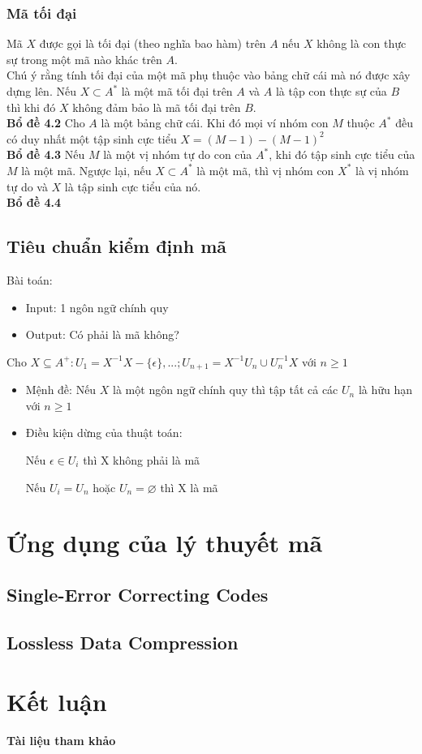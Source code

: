 \documentclass[14pt]{extreport}
\begin{document}
\subsection{Mã tối đại}
Mã $X$ được gọi là tối đại (theo nghĩa bao hàm) trên $A$ nếu $X$ không là con thực sự trong một mã nào khác trên $A$.\\
Chú ý rằng tính tối đại của một mã phụ thuộc vào bảng chữ cái mà nó được xây dựng lên. Nếu $X \subset A^*$ là một mã tối đại trên $A$ và $A$ là tập con thực sự của $B$ thì khi đó $X$ không đảm bảo là mã tối đại trên $B$.\\
\textbf{Bổ đề 4.2} Cho $A$ là một bảng chữ cái. Khi đó mọi ví nhóm con $M$ thuộc $A^*$ đều có duy nhất một tập sinh cực tiểu $X = (M-1) - (M-1)^2$\\
\textbf{Bổ đề 4.3} Nếu $M$ là một vị nhóm tự do con của $A^*$, khi đó tập sinh cực tiểu của $M$ là một mã. Ngược lại, nếu $X \subset A^*$ là một mã, thì vị nhóm con $X^*$ là vị nhóm tự do và $X$ là tập sinh cực tiểu của nó.\\
\textbf{Bổ đề 4.4}

\section{Tiêu chuẩn kiểm định mã}
Bài toán:
\begin{itemize}
\item Input: 1 ngôn ngữ chính quy
\item Output: Có phải là mã không?
\end{itemize}
Cho $X\subseteq A^+: U_1=X^{-1}X-\{\epsilon\},...;U_{n+1}=X^{-1}U_n \cup U_n^{-1}X$ với $n\geq 1$
\begin{itemize}
\item Mệnh đề: Nếu $X$ là một ngôn ngữ chính quy thì tập tất cả các $U_n$ là hữu hạn với $n\geq 1$

\item Điều kiện dừng của thuật toán:

Nếu $\epsilon \in U_i $ thì X không phải là mã

Nếu $U_i=U_n$ hoặc $U_n=\varnothing$ thì X là mã
\end{itemize}

\chapter{Ứng dụng của lý thuyết mã}
\section{Single-Error Correcting Codes}
\section{Lossless Data Compression}




\chapter{Kết luận}
{\huge \textbf{Tài liệu tham khảo}}
\end{document}
